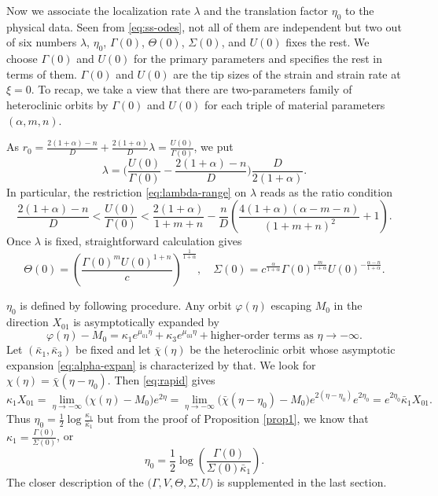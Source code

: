 \documentclass[a4paper,11pt]{article}
\theoremstyle{remark}
\begin{document}
Now we associate the localization rate $\lambda$  and the translation factor $\eta_0$  to the physical data. Seen from \eqref{eq:ss-odes}, not all of them are independent but two out of six numbers $\lambda$, $\eta_0$, $\Gamma(0)$, $\Theta(0)$, $\Sigma(0)$, and $U(0)$ fixes the rest. We choose $\Gamma(0)$ and $U(0)$ for the primary parameters and specifies the rest in terms of them. $\Gamma(0)$ and $U(0)$ are the tip sizes of the strain and strain rate at $\xi=0$. To recap, we take a view that there are two-parameters family of heteroclinic orbits by $\Gamma(0)$ and $U(0)$ for each triple of material parameters $(\alpha,m,n)$.

As $r_0 = \frac{2(1+\alpha)-n}{D} + \frac{2(1+\alpha)}{D}\lambda = \frac{U(0)}{\Gamma(0)}$,
we put
\begin{equation} \label{eq:lambda}
 \lambda = \Big(\frac{U(0)}{\Gamma(0)} - \frac{2(1+\alpha)-n}{D}\Big)\frac{D}{2(1+\alpha)}.
\end{equation}
In particular, the restriction \eqref{eq:lambda-range} on $\lambda$ reads as the ratio condition
\begin{equation} \label{eq:restriction}
 \frac{2(1+\alpha) -n}{D} < \frac{U(0)}{\Gamma(0)} < \frac{2(1+\alpha)}{1+m+n} -\frac{n}{D}\left( \frac{4(1+\alpha)(\alpha-m-n)}{(1+m+n)^2} +1\right).
\end{equation}
Once $\lambda$ is fixed, straightforward calculation gives
$$\Theta(0) = \left(\frac{\Gamma(0)^m U(0)^{1+n}}{c}\right)^{\frac{1}{1+\alpha}}, \quad \Sigma(0) = c^{\frac{\alpha}{1+\alpha}}\Gamma(0)^{\frac{m}{1+\alpha}} U(0)^{-\frac{\alpha-n}{1+\alpha}}.$$

$\eta_0$ is defined by following procedure. Any orbit $\varphi(\eta)$ escaping $M_0$ in the direction $X_{01}$ is asymptotically expanded by %
 \begin{equation}\label{eq:alpha-expan}
  \varphi(\eta) - M_0 = \kappa_1 e^{\mu_{01}\eta} + \kappa_3 e^{\mu_{03}\eta} + \text{higher-order terms as $\eta \rightarrow -\infty$}.
 \end{equation}
Let $(\bar\kappa_1,\bar\kappa_3)$ be fixed and let $\bar\chi(\eta)$ be the heteroclinic orbit whose asymptotic expansion \eqref{eq:alpha-expan} is characterized by that. We look for $\chi(\eta) = \bar\chi(\eta-\eta_0)$. Then \eqref{eq:rapid} gives
$$\kappa_1 X_{01}=\lim_{\eta \rightarrow -\infty}\big(\chi(\eta) - M_0\big)e^{2\eta} = \lim_{\eta \rightarrow -\infty} \big(\bar\chi(\eta-\eta_0) - M_0\big)e^{2(\eta-\eta_0)}e^{2\eta_0} = e^{2\eta_0}\bar\kappa_1 X_{01}.$$
Thus $\eta_0 = \frac{1}{2}\log {\frac{\kappa_1}{\bar\kappa_1}}$ but from the proof of Proposition \ref{prop1}, we know that
$\kappa_1 = \frac{\Gamma(0)}{\Sigma(0)}$, or
\begin{equation}
 \eta_0 = \frac{1}{2}\log \left(\frac{\Gamma(0)}{\Sigma(0)\bar\kappa_1}\right).%
\end{equation}
The closer description of the $\big(\Gamma,V,\Theta,\Sigma,U\big)$ is supplemented in the last section.
\end{document}
